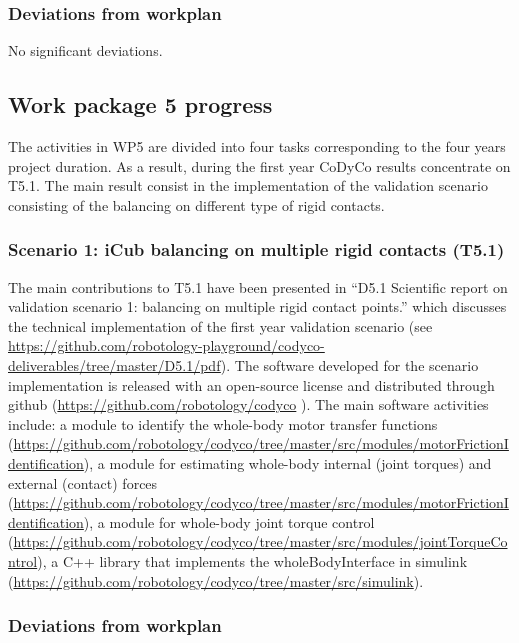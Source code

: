 \documentclass[12pt,a4paper,twoside]{article}
\begin{document}
\subsubsection{Deviations from workplan} 

No significant deviations. 

\subsection{Work package 5 progress}

The activities in WP5 are divided into four tasks corresponding to the four years project duration. As a result, during the first year CoDyCo results concentrate on T5.1. The main result consist in the implementation of the validation scenario consisting of the balancing on different type of rigid contacts.

\subsubsection{Scenario 1: iCub balancing on multiple rigid contacts (T5.1)}

The main contributions to T5.1 have been presented in ``D5.1 Scientific report on validation scenario 1: balancing on multiple rigid contact points.'' which discusses the technical implementation of the first year validation scenario (see \url{https://github.com/robotology-playground/codyco-deliverables/tree/master/D5.1/pdf}). The software developed for the scenario implementation is released with an open-source license and distributed through github (\url{https://github.com/robotology/codyco} ). The main software activities include: a module to identify the whole-body motor transfer functions (\url{https://github.com/robotology/codyco/tree/master/src/modules/motorFrictionIdentification}), a module for estimating whole-body internal (joint torques) and external (contact) forces (\url{https://github.com/robotology/codyco/tree/master/src/modules/motorFrictionIdentification}), a module for whole-body joint torque control (\url{https://github.com/robotology/codyco/tree/master/src/modules/jointTorqueControl}), a C++ library that implements the wholeBodyInterface in simulink (\url{https://github.com/robotology/codyco/tree/master/src/simulink}).

\subsubsection{Deviations from workplan}  
\end{document}
